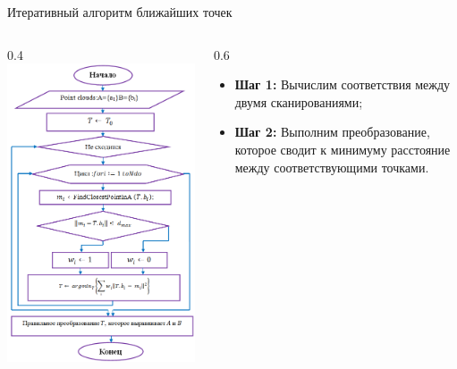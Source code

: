 \documentclass[10pt,pdf,hyperref={unicode},xcolor=table]{beamer}
\begin{document}
\begin{frame}{Итеративный алгоритм ближайших точек}		
\begin{columns}
		\begin{column} {0.4\textwidth}			
			\includegraphics[width=1\linewidth]{p6}
			\end{column}
			\begin{column} {0.6\textwidth}
			\begin{block}{}
	\begin{itemize}
	\item \textbf{Шаг 1:} Вычислим соответствия между двумя сканированиями;
	\item \textbf{Шаг 2:} Выполним преобразование, которое сводит к минимуму расстояние между соответствующими точками.

\end{itemize}
\end{block}
\end{column}
\end{columns}
\end{frame}
\end{document}
